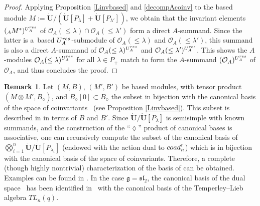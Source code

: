 \documentclass[11pt]{article}
\numberwithin{equation}{section}
\numberwithin{equation}{section}
\theoremstyle{definition}
\newtheorem{Remark}[teo]{Remark}
\newcommand{\Oo}{{\mathcal O}}
\begin{document}
\begin{proof}
 Applying Proposition \ref{Linvbased} and \eqref{decompAcoinv} to the based module $M:=\dot{\mathbf{U}} /(\dot{\mathbf{U}} [P_\lambda]+ \dot{\mathbf{U}} [P_{\lambda'}])$, we obtain that the invariant elements $({}_A M^*)^{U_A^{\rm res}}$ of $\Oo_A(\leq \lambda) \cap \Oo_A(\leq \lambda')$ form a direct $A$-summand. Since the latter is a~based $U_A^{\rm res}$-submodule of $ \Oo_A(\leq \lambda)$ and $\Oo_A(\leq \lambda')$, this summand is also a direct $A$-summand of $ \Oo_A(\leq \lambda)^{U_A^{\rm res}}$ and $\Oo_A(\leq \lambda')^{U_A^{\rm res}}$. This shows the $A$-modules $ \Oo_A(\leq \lambda)^{U_A^{\rm res}}$ for all $\lambda\in P_+$ match to form the $A$-summand $(\Oo_A)^{U_A^{\rm res}}$ of $\Oo_A$, and thus concludes the proof.
 \end{proof}

\begin{Remark} Let $(M,B)$, $(M', B')$ be based modules, with tensor product $(M\otimes M',B_{\lozenge})$, and $B_{\lozenge}[0]\subset B_{\lozenge}$ the subset in bijection with the canonical basis of the space of coinvariants~ (see Proposition \ref{Linvbased}). This subset is described in \cite[Proposition 27.3.8]{Lusztig} in terms of $B$ and $B'$. Since $\dot{\mathbf{U}} / \dot{\mathbf{U}} [P_{\lambda}]$ is semisimple with known summands, and the construction of the ``$\lozenge$'' product of canonical bases is associative, one can recursively compute the subset of the canonical basis of $\bigotimes_{i=1}^n \dot{\mathbf{U}} / \dot{\mathbf{U}} [P_{\lambda_i}]$ (endowed with the action dual to ${\rm coad}_n^r$) which is in bijection with the canonical basis of the space of coinvariants. Therefore, a complete (though highly nontrivial) characterization of the basis of \smash{$\big(\Oo_A^{\otimes n}\big)^{U_A^{\rm res}}$} can be obtained. Examples can be found in \cite[Section~27.3.10]{Lusztig}. In the case $\mathfrak{g}={\mathfrak{sl}_2}$, the canonical basis of the dual space~ has been identified in~\cite{FK} with the canonical basis of the Temperley--Lieb algebra $TL_n(q)$.
\end{Remark}
\end{document}
